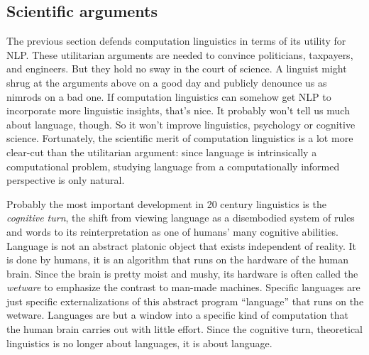 \subsection{Scientific arguments}
\label{ssec:formal_arguments_science}

The previous section defends computation linguistics in terms of its utility for NLP\@. 
These utilitarian arguments are needed to convince politicians, taxpayers, and engineers.
But they hold no sway in the court of science.
A linguist might shrug at the arguments above on a good day and publicly denounce us as nimrods on a bad one.
If computation linguistics can somehow get NLP to incorporate more linguistic insights, that's nice.
It probably won't tell us much about language, though.
So it won't improve linguistics, psychology or cognitive science.
Fortunately, the scientific merit of computation linguistics is a lot more clear-cut than the utilitarian argument: since language is intrinsically a computational problem, studying language from a computationally informed perspective is only natural.

Probably the most important development in 20 century linguistics is the \emph{cognitive turn}, the shift from viewing language as a disembodied system of rules and words to its reinterpretation as one of humans' many cognitive abilities.
Language is not an abstract platonic object that exists independent of reality.
It is done by humans, it is an algorithm that runs on the hardware of the human brain.
Since the brain is pretty moist and mushy, its hardware is often called the \emph{wetware} to emphasize the contrast to man-made machines.
Specific languages are just specific externalizations of this abstract program ``language'' that runs on the wetware.
Languages are but a window into a specific kind of computation that the human brain carries out with little effort.
Since the cognitive turn, theoretical linguistics is no longer about languages, it is about language.

